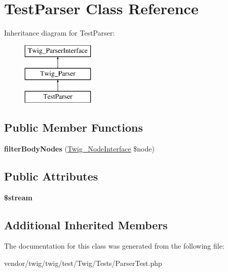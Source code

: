 \hypertarget{classTestParser}{}\section{Test\+Parser Class Reference}
\label{classTestParser}
Inheritance diagram for Test\+Parser\+:\begin{figure}[H]
\begin{center}
\leavevmode
\includegraphics[height=3.000000cm]{classTestParser}
\end{center}
\end{figure}
\subsection*{Public Member Functions}
\begin{DoxyCompactItemize}
\item 
{\bfseries filter\+Body\+Nodes} (\hyperlink{interfaceTwig__NodeInterface}{Twig\+\_\+\+Node\+Interface} \$node)\hypertarget{classTestParser_a82b7da9b65c4892dad0aa661f60e4169}{}\label{classTestParser_a82b7da9b65c4892dad0aa661f60e4169}

\end{DoxyCompactItemize}
\subsection*{Public Attributes}
\begin{DoxyCompactItemize}
\item 
{\bfseries \$stream}\hypertarget{classTestParser_a368f2cc37da8b1d769d55ee639b69106}{}\label{classTestParser_a368f2cc37da8b1d769d55ee639b69106}

\end{DoxyCompactItemize}
\subsection*{Additional Inherited Members}


The documentation for this class was generated from the following file\+:\begin{DoxyCompactItemize}
\item 
vendor/twig/twig/test/\+Twig/\+Tests/Parser\+Test.\+php\end{DoxyCompactItemize}
